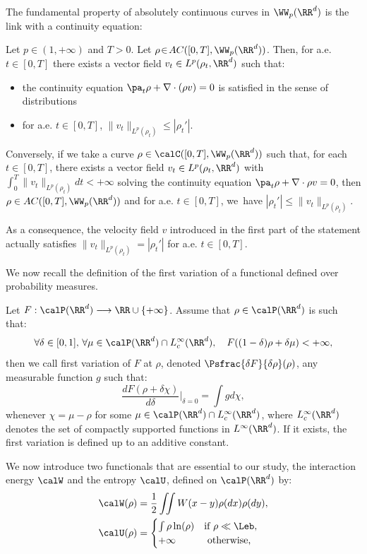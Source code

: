 The fundamental property of absolutely continuous curves in $\WW_p(\RR^d)$ is the link with a continuity equation:
\begin{theorem}\label{thm:ACcurves}
Let $p \!\in\! (1,+\infty)$ and $T\!>\!0$.
Let $\rho \!\in\! AC([0,T], \WW_p(\RR^d))$. Then, for a.e. $t \in [0,T]$ there exists a vector field $v_t \in L^p(\rho_t, \RR^d)$ such that:
\begin{itemize}
\item the continuity equation $\pa_t \rho + \nabla \cdot (\rho v) = 0$ is satisfied in the sense of distributions
\item for a.e. $t \in [0,T]$, $\|v_t\|_{L^p(\rho_t)} \leq |\rho_t'|$.
\end{itemize}
Conversely, if we take a curve $\rho \in \calC([0,T], \WW_p(\RR^d))$ such that, for each $t \in [0,T]$, there exists a vector field $v_t \in L^p(\rho_t, \RR^d)$ with $\int_0^T \|v_t\|_{L^p(\rho_t)} dt < +\infty $ solving the continuity equation $\pa_t \rho + \nabla \cdot \rho v = 0$, then $\rho \in AC([0,T], \WW_p(\RR^d))$ and for a.e. $t \in [0,T]$, we~have $|\rho_t'| \leq \|v_t\|_{L^p(\rho_t)}$.

As a consequence, the velocity field $v$ introduced in the first part of the statement actually satisfies $\|v_t\|_{L^p(\rho_t)} = |\rho_t'|$ for a.e. $t \in [0,T]$.
\end{theorem}
We now recall the definition of the first variation of a functional defined over probability measures.
\begin{defi}
Let $F : \calP(\RR^d) \longrightarrow \RR \cup \{+\infty\}$. Assume that $\rho \in \calP(\RR^d)$ is such that:
\[
\forall \delta \in [0,1], \, \forall \mu \in \calP(\RR^d) \cap L_c^\infty(\RR^d), \quad F((1-\delta) \rho + \delta \mu) < +\infty,
\]
then we call first variation of $F$ at $\rho$, denoted $\Psfrac{\delta F}{\delta \rho}(\rho)$, any measurable function $g$ such that:
\[
\frac{d F(\rho + \delta \chi)}{d \delta}\Big|_{\delta = 0} = \int g d\chi,
\]
whenever $\chi = \mu - \rho$ for some $\mu \in \calP(\RR^d) \cap L_c^\infty(\RR^d)$, where $L_c^\infty(\RR^d)$ denotes the set of compactly supported functions in $L^\infty(\RR^d)$. If it exists, the first variation is defined up to an additive constant.
\end{defi}
We now introduce two functionals that are essential to our study, the interaction energy $\calW$ and the entropy $\calU$, defined on $\calP(\RR^d)$ by:
\begin{align*}
& \calW(\rho) = \frac 12 \iint W(x-y) \rho(dx) \rho(dy), \\
& \calU(\rho) = \begin{cases}
\int \rho \ln(\rho) & \text{if } \rho \ll \Leb, \\
+\infty & \text{ otherwise,}
\end{cases}
\end{align*}
